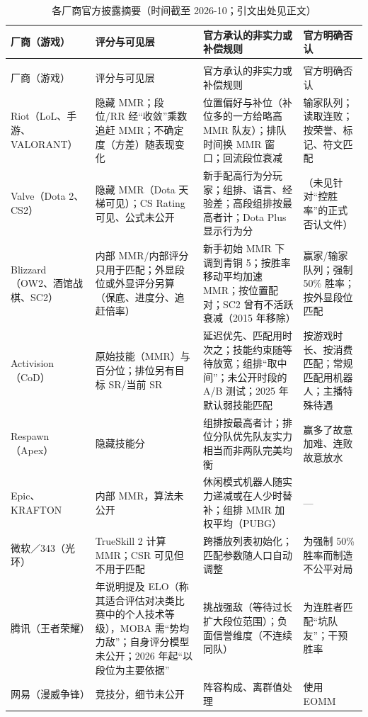 {\footnotesize
\setlength{\tabcolsep}{3pt}
\renewcommand{\arraystretch}{1.15}
\begin{longtable}{@{}>{\raggedright\arraybackslash}p{2.1cm}>{\raggedright\arraybackslash}p{3.4cm}>{\raggedright\arraybackslash}p{5.0cm}>{\raggedright\arraybackslash}p{4.6cm}@{}}
\caption{各厂商官方披露摘要（时间截至 2026-10；引文出处见正文）}\label{tab:ch1b-disclosure}\\
\toprule
厂商（游戏） & 评分与可见层 & 官方承认的非实力或补偿规则 & 官方明确否认 \\
\midrule
\endfirsthead
\multicolumn{4}{@{}l}{\small 续\cref{tab:ch1b-disclosure}}\\
\toprule
厂商（游戏） & 评分与可见层 & 官方承认的非实力或补偿规则 & 官方明确否认 \\
\midrule
\endhead
\bottomrule
\endfoot
Riot（LoL、手游、VALORANT） & 隐藏 MMR；段位/RR 经“收敛”乘数追赶 MMR；不确定度（方差）随表现变化 & 位置偏好与补位（补位多的一方给略高 MMR 队友）；排队时间换 MMR 窗口；回流段位衰减 & 输家队列；读取连败；按荣誉、标记、符文匹配 \\
Valve（Dota 2、CS2） & 隐藏 MMR（Dota 天梯可见）；CS Rating 可见、公式未公开 & 新手配高行为分玩家；组排、语言、经验差；高段组排按最高者计；Dota Plus 显示行为分 & （未见针对“控胜率”的正式否认文件） \\
Blizzard（OW2、酒馆战棋、SC2） & 内部 MMR/内部评分只用于匹配；外显段位或外显评分另算（保底、进度分、追赶倍率） & 新手初始 MMR 下调到青铜 5；按胜率移动平均加速 MMR；按位置配对；SC2 曾有不活跃衰减（2015 年移除） & 赢家/输家队列；强制 50\% 胜率；按外显段位匹配 \\
Activision（CoD） & 原始技能（MMR）与百分位；排位另有目标 SR/当前 SR & 延迟优先、匹配用时次之；技能约束随等待放宽；组排“取中间”；未公开时段的 A/B 测试；2025 年默认弱技能匹配 & 按游戏时长、按消费匹配；常规匹配用机器人；主播特殊待遇 \\
Respawn（Apex） & 隐藏技能分 & 组排按最高者计；排位分队优先队友实力相当而非两队完美均衡 & 赢多了故意加难、连败故意放水 \\
Epic、KRAFTON & 内部 MMR，算法未公开 & 休闲模式机器人随实力递减或在人少时替补；组排 MMR 加权平均（PUBG） & — \\
微软／343（光环） & TrueSkill 2 计算 MMR；CSR 可见但不用于匹配 & 跨播放列表初始化；匹配参数随人口自动调整 & 为强制 50\% 胜率而制造不公平对局 \\
腾讯（王者荣耀） & 2018 年说明提及 ELO（称其适合评估对决类比赛中的个人技术等级），MOBA 需“势均力敌”；自身评分模型未公开；2026 年起“以段位为主要依据” & 挑战强敌（等待过长扩大段位范围）；负面信誉维度（不连续同队） & 为连胜者匹配“坑队友”；干预胜率 \\
网易（漫威争锋） & 竞技分，细节未公开 & 阵容构成、离群值处理 & 使用 EOMM \\
\end{longtable}
}

